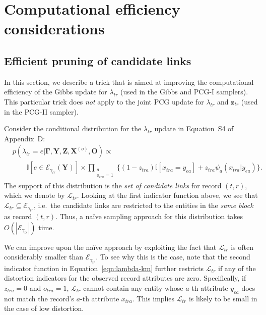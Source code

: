 \documentclass[12pt,letterpaper]{article}
\renewcommand\vec{\bm}
\newcommand{\partset}{\mathcal{E}} %
\newcommand{\1}[1]{\mathbb{I}\!\left[#1\right]} %
\begin{document}
\section{Computational efficiency considerations}\label{sec:tricks}

\subsection{Efficient pruning of candidate links}
\label{sec:pruning-links}
In this section, we describe a trick that is aimed at improving the 
computational efficiency of the Gibbs update for $\lambda_{tr}$ 
(used in the Gibbs and PCG-I samplers).
This particular trick does \emph{not} apply to the joint PCG update 
for $\lambda_{tr}$ and $\vec{z}_{tr}$ (used in the PCG-II sampler).

Consider the conditional distribution for the $\lambda_{tr}$ update in 
Equation~S4 of Appendix~D:
\begin{equation}
\begin{split}
& p(\lambda_{tr} = e | \vec{\Gamma}, \vec{Y}, \vec{Z}, \vec{X}^{(o)}, \vec{O}) \propto \\
& \qquad \1{e \in \partset_{\gamma_{tr}}(\vec{Y})}
  \times \prod_{\substack{a\\o_{tra}=1}} \Big\{(1 - z_{tra}) \1{x_{tra} = y_{ea}} 
  + z_{tra} \psi_{a}(x_{tra}|y_{ea}) \Big\}.
\end{split}
\label{eqn:lambda-km}
\end{equation}
The support of this distribution is the \emph{set of candidate links} 
for record $(t,r)$, which we denote by $\mathcal{L}_{tr}$.
Looking at the first indicator function above, we see that 
$\mathcal{L}_{tr} \subseteq \partset_{\gamma_{tr}}$, i.e.\ the 
candidate links are restricted to the entities in the 
\emph{same block} as record $(t,r)$. 
Thus, a na\"{i}ve sampling approach for this distribution takes 
$O(|\partset_{\gamma_{tr}}|)$ time.

We can improve upon the na\"{i}ve approach by exploiting the fact that 
$\mathcal{L}_{tr}$ is often considerably smaller than 
$\partset_{\gamma_{tr}}$.  
To see why this is the case, note that the second indicator function 
in Equation~\ref{eqn:lambda-km} further restricts $\mathcal{L}_{tr}$ 
if any of the distortion indicators for the observed record attributes 
are zero.
Specifically, if $z_{tra} = 0$ and $o_{tra}=1$, $\mathcal{L}_{tr}$ cannot 
contain any entity  whose $a$-th attribute $y_{ea}$ does not match the 
record's $a$-th attribute $x_{tra}$.
This implies $\mathcal{L}_{tr}$ is likely to be small in the case 
of low distortion.
\end{document}
